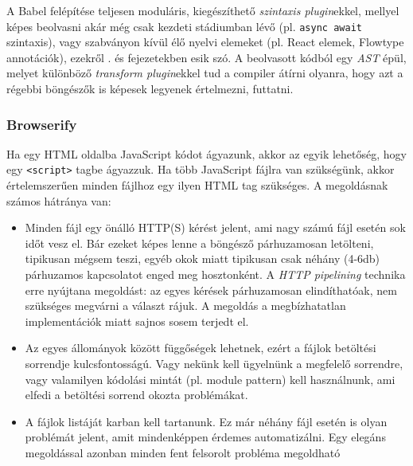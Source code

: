 A Babel felépítése teljesen moduláris, kiegészíthető \emph{szintaxis
  plugin}ekkel, mellyel képes beolvasni akár még csak kezdeti stádiumban lévő
(pl. \texttt{async await} szintaxis), vagy szabványon kívül élő nyelvi elemeket
(pl. React elemek, Flowtype annotációk), ezekről . és
 fejezetekben esik szó.  A beolvasott kódból egy \emph{AST}
épül, melyet különböző \emph{transform plugin}ekkel tud a compiler átírni
olyanra, hogy azt a régebbi böngészők is képesek legyenek értelmezni, futtatni.

\subsubsection{Browserify}

Ha egy HTML oldalba JavaScript kódot ágyazunk, akkor az egyik lehetőség, hogy
egy \texttt{<script>} tagbe ágyazzuk. Ha több JavaScript fájlra van szükségünk,
akkor értelemszerűen minden fájlhoz egy ilyen HTML tag szükséges.  A megoldásnak
számos hátránya van:

\begin{itemize}
\item Minden fájl egy önálló HTTP(S) kérést jelent, ami nagy számú fájl esetén
  sok időt vesz el. Bár ezeket képes lenne a böngésző párhuzamosan letölteni,
  tipikusan mégsem teszi, egyéb okok miatt tipikusan csak néhány (4-6db)
  párhuzamos kapcsolatot enged meg hosztonként.  A \emph{HTTP
    pipelining}\cite[6.3.2 fejezet]{rfc7230}
  technika erre nyújtana megoldást: az egyes kérések párhuzamosan
  elindíthatóak, nem szükséges megvárni a választ rájuk. A
  megoldás a megbízhatatlan implementációk miatt sajnos sosem terjedt el.
\item Az egyes állományok között függőségek lehetnek, ezért a fájlok betöltési
  sorrendje kulcsfontosságú. Vagy nekünk kell ügyelnünk a megfelelő sorrendre,
  vagy valamilyen kódolási mintát (pl. module pattern\cite[Module
  Pattern]{jsdesignpatterns}) kell használnunk, ami
  elfedi a betöltési sorrend okozta problémákat.
\item A fájlok listáját karban kell tartanunk. Ez már néhány fájl esetén is
  olyan problémát jelent, amit mindenképpen érdemes automatizálni. Egy elegáns
  megoldással azonban minden fent felsorolt probléma megoldható
\end{itemize}

